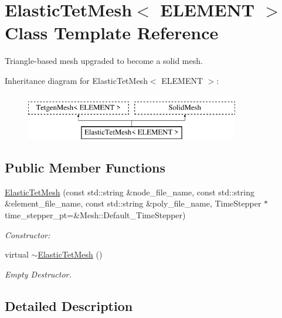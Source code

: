 \hypertarget{classElasticTetMesh}{}\section{Elastic\+Tet\+Mesh$<$ E\+L\+E\+M\+E\+NT $>$ Class Template Reference}
\label{classElasticTetMesh}


Triangle-\/based mesh upgraded to become a solid mesh.  


Inheritance diagram for Elastic\+Tet\+Mesh$<$ E\+L\+E\+M\+E\+NT $>$\+:\begin{figure}[H]
\begin{center}
\leavevmode
\includegraphics[height=2.000000cm]{classElasticTetMesh}
\end{center}
\end{figure}
\subsection*{Public Member Functions}
\begin{DoxyCompactItemize}
\item 
\hyperlink{classElasticTetMesh_afa0c8df37665c2b31b430de7e50dcc6b}{Elastic\+Tet\+Mesh} (const std\+::string \&node\+\_\+file\+\_\+name, const std\+::string \&element\+\_\+file\+\_\+name, const std\+::string \&poly\+\_\+file\+\_\+name, Time\+Stepper $\ast$time\+\_\+stepper\+\_\+pt=\&Mesh\+::\+Default\+\_\+\+Time\+Stepper)
\begin{DoxyCompactList}\small\item\em Constructor\+: \end{DoxyCompactList}\item 
virtual \hyperlink{classElasticTetMesh_a4d072ceb1fb8eb0d3d0f619e0221914c}{$\sim$\+Elastic\+Tet\+Mesh} ()
\begin{DoxyCompactList}\small\item\em Empty Destructor. \end{DoxyCompactList}\end{DoxyCompactItemize}


\subsection{Detailed Description}
